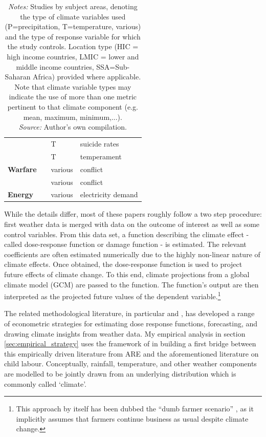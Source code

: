 \documentclass[a4paper,12pt]{article}
\theoremstyle{plain}
\theoremstyle{definition}
\theoremstyle{definition}
\theoremstyle{definition}
\theoremstyle{definition}
\begin{document}
\begin{table}[t!]
\begin{tabular}{|p{2.8cm}|p{6cm}|p{2.2cm}|p{3.5cm}| }
    \ \ & \citet{Burke2018} & T & suicide rates\\
    \ \ & \citet{Baylis2020} & T & temperament\\
    \hline
    \textbf{Warfare} & \citet{Hsiang2011} & various & conflict\\
    \ \ & \citet{Burke2015} & various & conflict\\
    \hline
    \textbf{Energy} & \citet{Auffhammer2014} & various & electricity demand\\
    \hline
    \end{tabular}
    \caption*{\footnotesize{\textit{Notes:} Studies by subject areas, denoting the type of climate variables used (P=precipitation, T=temperature, various) and the type of response variable for which the study controls. Location type (HIC = high income countries, LMIC = lower and middle income countries, SSA=Sub-Saharan Africa) provided where applicable. Note that climate variable types may indicate the use of more than one metric pertinent to that climate component (e.g. mean, maximum, minimum,...).\\ \textit{Source:} Author's own compilation.}}
    \label{tab:ARE_lit}
\end{table}

While the details differ, most of these papers roughly follow a two step procedure: first weather data is merged with data on the outcome of interest as well as some control variables. From this data set, a function describing the climate effect - called dose-response function or damage function - is estimated. The relevant coefficients are often estimated numerically due to the highly non-linear nature of climate effects. Once obtained, the dose-response function is used to project future effects of climate change. To this end, climate projections from a global climate model (GCM) are passed to the function. The function's output are then interpreted as the projected future values of the dependent variable.\footnote{This approach by itself has been dubbed the ``dumb farmer scenario'' \citep{Auffhammer2014a}, as it implicitly assumes that farmers continue business as usual despite climate change.}

The related methodological literature, in particular \citet{Timmins2009, Schlenker2010a, Auffhammer2013, Hansen2014, Auffhammer2018} and \citet{Hsiang2016a}, has developed a range of econometric strategies for estimating dose response functions, forecasting, and drawing climate insights from weather data. My empirical analysis in section \ref{sec:empirical_strategy} uses the framework of \citet{Hsiang2016a} in building a first bridge between this empirically driven literature from ARE and the aforementioned literature on child labour. Conceptually, rainfall, temperature, and other weather components are modelled to be jointly drawn from an underlying distribution which is commonly called `climate'. 
\end{document}
